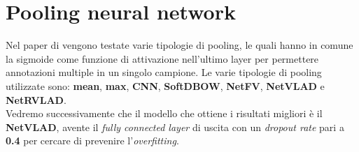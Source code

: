 \section{Pooling neural network}
Nel paper di \citet{soccerNet} vengono testate varie tipologie di pooling, le quali hanno in comune la sigmoide come funzione di attivazione nell'ultimo layer per permettere annotazioni multiple in un singolo campione.
Le varie tipologie di pooling utilizzate sono: \textbf{mean}, \textbf{max}, \textbf{CNN}, \textbf{SoftDBOW}, \textbf{NetFV}, \textbf{NetVLAD} e \textbf{NetRVLAD}. \cite{MiechPooling}
\\Vedremo successivamente che il modello che ottiene i risultati migliori è il \textbf{NetVLAD}, avente il \textit{fully connected layer} di uscita con un \textit{dropout rate} pari a \textbf{0.4} per cercare di prevenire l'\textit{overfitting}.

